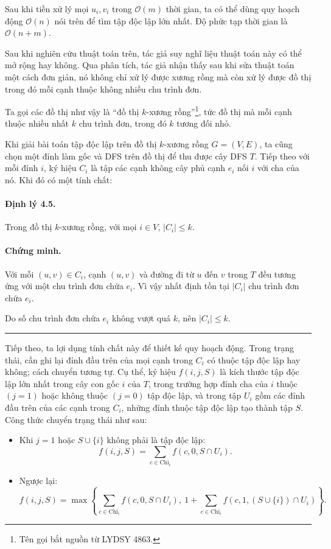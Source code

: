 \documentclass[11pt]{article}
\newcommand{\Oh}{\mathcal{O}}
\newcommand{\qedmark}{\hfill\rule{0.7ex}{0.7ex}}
\begin{document}
Sau khi tiền xử lý mọi \(u_i,v_i\) trong \(\Oh(m)\) thời gian, ta có thể dùng
quy hoạch động \(\Oh(n)\) nói trên để tìm tập độc lập lớn nhất. Độ phức tạp
thời gian là \(\Oh(n+m)\).

Sau khi nghiên cứu thuật toán trên, tác giả suy nghĩ liệu thuật toán này có
thể mở rộng hay không. Qua phân tích, tác giả nhận thấy sau khi sửa thuật toán
một cách đơn giản, nó không chỉ xử lý được xương rồng mà còn xử lý được đồ thị
trong đó mỗi cạnh thuộc không nhiều chu trình đơn.

Ta gọi các đồ thị như vậy là ``đồ thị \(k\)-xương rồng''\footnote{Tên gọi bắt
nguồn từ LYDSY 4863.}, tức đồ thị mà mỗi cạnh thuộc nhiều nhất \(k\) chu trình
đơn, trong đó \(k\) tương đối nhỏ.

Khi giải bài toán tập độc lập trên đồ thị \(k\)-xương rồng \(G=(V,E)\), ta
cũng chọn một đỉnh làm gốc và DFS trên đồ thị để thu được cây DFS \(T\). Tiếp
theo với mỗi đỉnh \(i\), ký hiệu \(C_i\) là tập các cạnh không cây phủ cạnh
\(e_i\) nối \(i\) với cha của nó. Khi đó có một tính chất:

\paragraph{Định lý 4.5.}
Trong đồ thị \(k\)-xương rồng, với mọi \(i\in V\), \(|C_i|\le k\).

\paragraph{Chứng minh.}
Với mỗi \((u,v)\in C_i\), cạnh \((u,v)\) và đường đi từ \(u\) đến \(v\) trong
\(T\) đều tương ứng với một chu trình đơn chứa \(e_i\). Vì vậy nhất định tồn
tại \(|C_i|\) chu trình đơn chứa \(e_i\).

Do số chu trình đơn chứa \(e_i\) không vượt quá \(k\), nên \(|C_i|\le k\).
\qedmark

Tiếp theo, ta lợi dụng tính chất này để thiết kế quy hoạch động. Trong trạng
thái, cần ghi lại đỉnh đầu trên của mọi cạnh trong \(C_i\) có thuộc tập độc lập
hay không; cách chuyển tương tự. Cụ thể, ký hiệu \(f(i,j,S)\) là kích thước tập
độc lập lớn nhất trong cây con gốc \(i\) của \(T\), trong trường hợp đỉnh cha
của \(i\) thuộc \((j=1)\) hoặc không thuộc \((j=0)\) tập độc lập, và trong tập
\(U_i\) gồm các đỉnh đầu trên của các cạnh trong \(C_i\), những đỉnh thuộc tập
độc lập tạo thành tập \(S\). Công thức chuyển trạng thái như sau:

\begin{itemize}
  \item Khi \(j=1\) hoặc \(S\cup\{i\}\) không phải là tập độc lập:
  \[
    f(i,j,S)=\sum_{c\in\mathrm{Chi}_i} f(c,0,S\cap U_i).
  \]

  \item Ngược lại:
  \[
    f(i,j,S)=\max\left\{
      \sum_{c\in\mathrm{Chi}_i} f(c,0,S\cap U_i),\
      1+\sum_{c\in\mathrm{Chi}_i} f(c,1,(S\cup\{i\})\cap U_i)
    \right\}.
  \]
\end{itemize}
\end{document}

